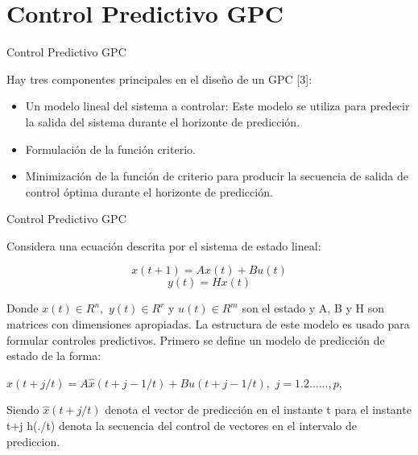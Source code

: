 \documentclass{beamer}
\begin{document}
\section{Control Predictivo GPC}
\begin{frame}{Control Predictivo GPC}
\begin{justify}

Hay tres componentes principales en el diseño de un GPC [3]:
\begin{itemize}


    \vspace{0.3cm}
    \item Un modelo lineal del sistema a controlar: Este modelo se utiliza para predecir la salida del sistema durante el horizonte de predicción.
    
    \vspace{0.3cm}
    \item Formulación de la función criterio.
    
    \vspace{0.3cm}
    \item Minimización de la función de criterio para producir la secuencia de salida de control óptima durante el horizonte de predicción.

\end{itemize}
\end{justify}
\end{frame}

\begin{frame}{Control Predictivo GPC}
\begin{justify}
Considera una ecuación descrita por el sistema de estado lineal:

\vspace{0.3cm}
   $$x(t+1)=Ax(t)+Bu(t)$$
   $$y(t)=Hx(t)$$
   
\vspace{0.2cm}
Donde $x(t) \in R^n,$ $y(t) \in R^r$ y $u(t) \in R^m$ son el estado y A, B y H son matrices con dimensiones apropiadas. La estructura de este modelo es usado para formular controles predictivos. Primero se define un modelo de predicción de estado de la forma:

\vspace{0.3cm}
$\hat{x}(t+j/t)=A\hat{x}(t+j-1/t)+Bu(t+j-1/t),$ $j=1. 2. ....., p, $ 

\vspace{0.3cm}
Siendo $\hat{x}(t+j/t)$ denota el vector de predicción en el instante t para  el instante t+j h(./t) denota la secuencia del control de vectores en el intervalo de prediccion. 

\end{justify}
\end{frame}
\end{document}
